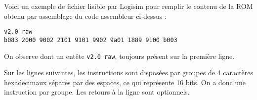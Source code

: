 \documentclass{article}
\begin{document}
Voici un exemple de fichier lisible par Logisim pour remplir le contenu de la ROM obtenu par assemblage du code assembleur ci-dessus :
\begin{lstlisting}
v2.0 raw
b083 2000 9002 2101 9101 9902 9a01 1889 9100 b003
\end{lstlisting}

On observe dont un entête \texttt{v2.0 raw}, toujours présent sur la première ligne.

Sur les lignes suivantes, les instructions sont disposées par groupes de 4 caractères hexadecimaux séparés par des espaces, ce qui représente 16 bits.
On a donc une instruction par groupe.
Les retours à la ligne sont optionnels.
\end{document}

